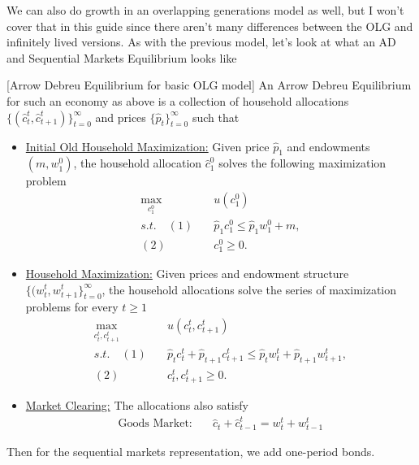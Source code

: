 \documentclass[11pt,english]{article}
\begin{document}
We can also do growth in an overlapping generations model as well, but I won't cover that in this guide since there aren't many differences between the OLG and infinitely lived versions. As with the previous model, let's look at what an AD and Sequential Markets Equilibrium looks like
\begin{definition}{[Arrow Debreu Equilibrium for basic OLG model]} An Arrow Debreu Equilibrium for such an economy as above is a collection of household allocations $\{(\hat{c}_t^t, \hat{c}_{t+1}^t)\}_{t=0}^\infty$ and prices $\{\hat{p}_t\}_{t=0}^\infty$ such that 
\begin{itemize}
\item \underline{Initial Old Household Maximization:} Given price $\hat{p}_1$ and endowments $(m, w_1^0)$, the household allocation $\hat{c}_1^0$ solves the following maximization problem
\begin{align*}
\max_{c^0_1}&\quad u(c^0_1)\\
s.t.\quad (1)&\quad \hat{p}_1 c_1^0 \leq \hat{p}_1w_1^0 + m,\\
(2)&\quad c_1^0 \geq 0.
\end{align*}
\item\underline{Household Maximization:} Given prices and endowment structure $\{(w_t^t, w_{t+1}^t\}_{t=0}^\infty$, the household allocations solve the series of maximization problems for every $t \geq 1$
\begin{align*}
\max_{c^t_t, c_{t+1}^t}&\quad u(c^t_t, c_{t+1}^t)\\
s.t.\quad (1)&\quad \hat{p}_t c^t_t + \hat{p}_{t+1} c_{t+1}^t \leq \hat{p}_t w^t_t + \hat{p}_{t+1} w_{t+1}^t,\\
(2)&\quad c_t^t, c_{t+1}^t \geq 0.
\end{align*}
\item\underline{Market Clearing:} The allocations also satisfy \begin{align*}
\text{Goods Market:}&\quad \hat{c}_t + \hat{c}_{t-1}^t = w_t^t + w_{t-1}^t
\end{align*}
\end{itemize}
\end{definition}
Then for the sequential markets representation, we add one-period bonds.
\end{document}
